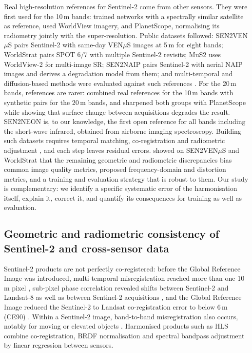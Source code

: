 \documentclass[pdflatex,sn-basic,referee,lineno]{sn-jnl}
\begin{document}
Real high-resolution references for Sentinel-2 come from other sensors. They were first used for the 10\,m bands:
\citet{galar2020real} trained networks with a spectrally similar satellite as reference, \citet{salgueiro2020esrgan}
used WorldView imagery, and \citet{latte2020planetscope} PlanetScope, normalising its radiometry jointly with the
super-resolution. Public datasets followed: SEN2VEN$\mu$S \citep{michel2022sen2venus} pairs Sentinel-2 with
same-day VEN$\mu$S images at 5\,m for eight bands; WorldStrat \citep{cornebise2022worldstrat} pairs SPOT 6/7 with
multiple Sentinel-2 revisits; MuS2 \citep{kowaleczko2023mus2} uses WorldView-2 for multi-image SR; SEN2NAIP
\citep{aybar2024sen2naip} pairs Sentinel-2 with aerial NAIP images and derives a degradation model from them; and
multi-temporal and diffusion-based methods were evaluated against such references
\citep{tarasiewicz2023deepsent,donike2025diffusion}. For the 20\,m bands, references are rarer:
\citet{major2025holistic} combined real references for the 10\,m bands with synthetic pairs for the 20\,m bands, and
\citet{li2020planetscope} sharpened both groups with PlanetScope while showing that surface change between
acquisitions degrades the result. SEN2NEON \citep{donike2026sen2neon} is, to our knowledge, the first open
reference for all bands including the short-wave infrared, obtained from airborne imaging spectroscopy.
Building such datasets requires temporal matching, co-registration and radiometric adjustment
\citep{malczewska2023datasets}, and each step leaves residual errors. \citet{michel2025revisiting} showed on
SEN2VEN$\mu$S and WorldStrat that the remaining geometric and radiometric discrepancies bias common image quality
metrics, proposed frequency-domain and distortion metrics, and a training and evaluation strategy that is robust to
them. Our study is complementary: we identify a specific systematic error of the harmonisation itself, explain it,
correct it, and quantify its consequences for training as well as evaluation.

\subsection{Geometric and radiometric consistency of Sentinel-2 and cross-sensor data}

Sentinel-2 products are not perfectly co-registered: before the Global Reference Image was introduced,
multi-temporal misregistration reached more than one 10\,m pixel \citep{yan2018s2misreg}, sub-pixel phase correlation
revealed shifts between Sentinel-2 and Landsat-8 as well as between Sentinel-2 acquisitions \citep{skakun2017coreg},
and the Global Reference Image reduced the Sentinel-2 to Landsat co-registration error to below 6\,m (CE90)
\citep{rengarajan2024coreg}. Within a Sentinel-2 image, band-to-band misregistration also occurs, notably for moving
or elevated objects \citep{skakun2017bandmisreg}. Harmonised products such as HLS \citep{claverie2018hls} combine
co-registration, BRDF normalisation and spectral bandpass adjustment by linear regression between sensors.
\end{document}
